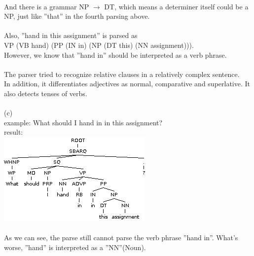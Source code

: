 \documentclass[11pt]{article}
\begin{document}
\\
And there is a grammar NP $\rightarrow$ DT, which means a determiner itself could be a NP, just like ''that'' in the fourth parsing above.\\
\\
Also, ''hand in this assignment'' is parsed as \\
VP (VB hand)
      (PP (IN in)
            (NP (DT this) (NN assignment))).\\
However, we know that ''hand in'' should be interpreted as a verb phrase.\\
\\
The parser tried to recognize relative clauses in a relatively complex sentence.\\
In addition, it differentiates adjectives as normal, comparative and superlative. It also detects tenses of verbs.\\
\\
(c)\\
example:  What should I hand in in this assignment?\\
result:\\
\includegraphics[width=0.8\linewidth]{parse5.png}\\
\\
As we can see, the parse still cannot parse the verb phrase ''hand in''. What's worse, ''hand'' is interpreted as a ''NN''(Noun).\\
\end{document}
